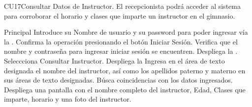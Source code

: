 

	\begin{UseCase}{CU17}{Consultar Datos de Instructor.}{
			El recepcionista podrá acceder al sistema para corroborar el horario y clases que imparte 
		un instructor en el gimnasio.}
	\end{UseCase}
	\begin{UCtrayectoria}{Principal}
		\UCpaso[\UCactor] Introduce su Nombre de usuario y su password para poder ingresar vía la  \label{CU1LoginJI}.
		\UCpaso[\UCactor] Confirma la operación presionando el botón Iniciar Sesión.
		\UCpaso Verifica que el nombre y contraseña para ingresar iniciar sesión se encuentren.
		\UCpaso Despliega la .
		\UCpaso Seleccciona Consultar Instructor.
		\UCpaso Despliega la 
		\UCpaso[\UCactor]Ingresa en el área de texto designada el nombre del instructor, así como los apellidos paterno y materno
				en sus áreas de texto designadas.
		\UCpaso Búsca coincidencias con los datos ingresados.
		\UCpaso Despliega una pantalla con el nombre completo del instructor, Edad, Clases que imparte, horario y una foto del instructor.

	\end{UCtrayectoria}

